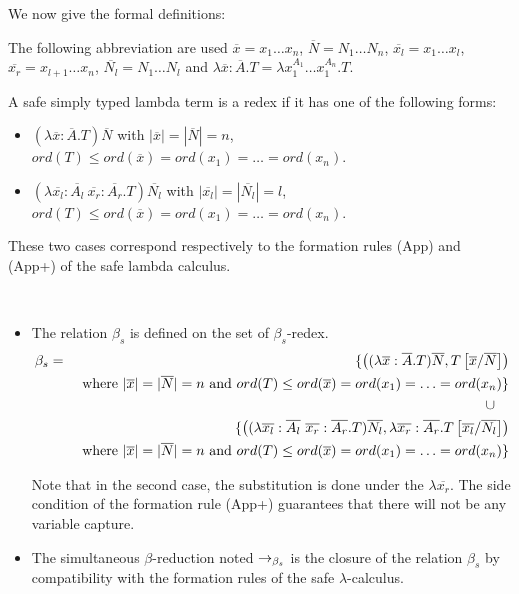 We now give the formal definitions:

The following abbreviation are used $\overline{x} = x_1 \ldots x_n$,
$\overline{N} = N_1 \ldots N_n$, $\overline{x_l} = x_1 \ldots x_l$,
$\overline{x_r} = x_{l+1} \ldots x_n$, $\overline{N_l} = N_1 \ldots
N_l$ and $\lambda \overline{x} : \overline{A} . T = \lambda
x_1^{A_1} \ldots x_1^{A_n} . T$.

\begin{dfn}
A safe simply typed lambda term is a redex if it has one of the
following forms:
\begin{itemize}
\item $(\lambda \overline{x} : \overline{A} . T) \overline{N}$
\quad with $|\overline{x}| = |\overline{N}| = n$, $ord(T) \leq
ord(\overline{x}) = ord(x_1) = \ldots = ord(x_n)$.

\item $(\lambda \overline{x_l} : \overline{A_l} \ \overline{x_r}: \overline{A_r} . T) \overline{N_l}$
\quad with $|\overline{x_l}| = |\overline{N_l}| = l$, $ord(T) \leq
ord(\overline{x}) = ord(x_1) = \ldots = ord(x_n)$.
\end{itemize}

These two cases correspond respectively to the formation rules (App)
and (App+) of the safe lambda calculus.

\end{dfn}

\begin{dfn} \
\begin{itemize}
\item The relation $\beta_s$ is defined on the set of $\beta_s$-redex.
\begin{eqnarray*}
\beta_s &=&
 \{  \left( (\lambda \overline{x} : \overline{A} . T) \overline{N}, T\left[ \overline{x}/\overline{N} \right] \right) \\
&& \mbox{ where }
     |\overline{x}| = |\overline{N}| = n \mbox{ and } ord(T) \leq ord(\overline{x}) = ord(x_1) = \ldots = ord(x_n)
\} \\
 && \cup \quad \\
&& \{
    \left( (\lambda \overline{x_l} : \overline{A_l} \  \overline{x_r}: \overline{A_r} . T) \overline{N_l}, \lambda \overline{x_r}: \overline{A_r} . T\left[ \overline{x_l}/\overline{N_l} \right] \right) \\
&& \mbox{ where }
 |\overline{x}| = |\overline{N}| = n \mbox{ and } ord(T) \leq ord(\overline{x}) = ord(x_1) = \ldots = ord(x_n)
\}
\end{eqnarray*}

Note that in the second case, the substitution is done under the
$\lambda \overline{x_r}$. The side condition of the formation rule
(App+) guarantees that there will not be any variable capture.

\item
The simultaneous $\beta$-reduction noted $\rightarrow_{\beta_s}$ is the closure
of the relation $\beta_s$ by compatibility with the formation rules
of the safe $\lambda$-calculus.
\end{itemize}
\end{dfn}

